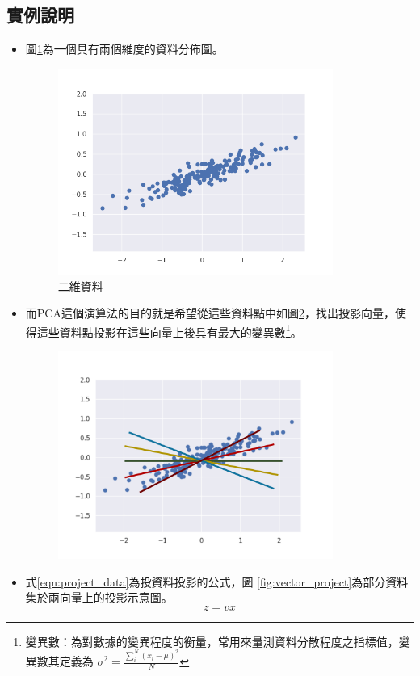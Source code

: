 \subsection{實例說明}

\begin{itemize}
	\item
	      圖\ref{fig:pca_demostrate}為一個具有兩個維度的資料分佈圖。


	      \begin{figure}[h]
		      \centering
		      \includegraphics[width=9cm]{pic/pca_demostrate.png}
		      \caption{二維資料}
		      \label{fig:pca_demostrate}
	      \end{figure}


	\newpage
	\item
	      而PCA這個演算法的目的就是希望從這些資料點中如圖\ref{fig:pca_vector_to_find}，找出投影向量，使得這些資料點投影在這些向量上後具有最大的變異數\footnote{\noindent 變異數：為對數據的變異程度的衡量，常用來量測資料分散程度之指標值，變異數其定義為 \(\sigma^2=\frac{{}\sum^{N}_{i}(x_i-\mu )^2}{N}\) }。
	      \begin{figure}[h]
		      \centering
		      \includegraphics[width=9cm]{./pic/iVu9zQYG.png}
		      \caption{}
		      \label{fig:pca_vector_to_find}
	      \end{figure}
	\item
		式\ref{eqn:project_data}為投資料投影的公式，圖 \ref{fig:vector_project}為部分資料集於兩向量上的投影示意圖。 
		\begin{equation}
			\label{eqn:project_data}
			 z = vx
		\end{equation}



\end{itemize}

